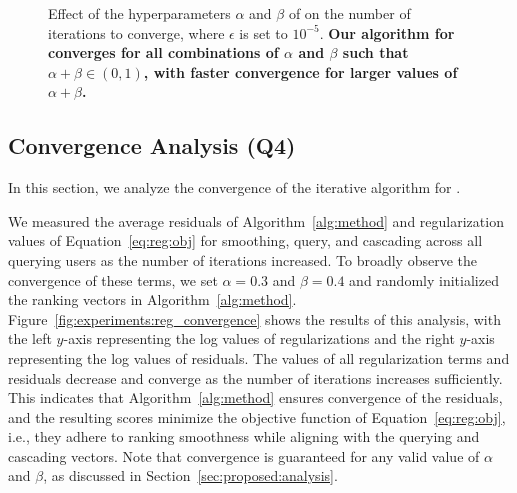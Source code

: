 \begin{figure}[t]
    \centering
    
    \caption{
        \label{fig:experiments:iteration}
        Effect of the hyperparameters $\alpha$ and $\beta$ of \method on the number of iterations to converge, where $\epsilon$ is set to $10^{-5}$.
        \textbf{Our algorithm for \method converges for all combinations of $\alpha$ and $\beta$ such that $\alpha + \beta \in (0, 1)$, with faster convergence for larger values of $\alpha + \beta$.}
    }
\end{figure}

\subsection{Convergence Analysis (Q4)}
\label{sec:experiments:convergence}
In this section, we analyze the convergence of the iterative algorithm for \method.

We measured the average residuals of Algorithm~\ref{alg:method} and regularization values of Equation~\eqref{eq:reg:obj} for smoothing, query, and cascading across all querying users as the number of iterations increased.
To broadly observe the convergence of these terms, we set $\alpha = 0.3$ and $\beta = 0.4$ and randomly initialized the ranking vectors in Algorithm~\ref{alg:method}.
Figure~\ref{fig:experiments:reg_convergence} shows the results of this analysis, with the left $y$-axis representing the log values of regularizations and the right $y$-axis representing the log values of residuals.
The values of all regularization terms and residuals decrease and converge as the number of iterations increases sufficiently.
This indicates that Algorithm~\ref{alg:method} ensures convergence of the residuals, and the resulting scores minimize the objective function of Equation~\eqref{eq:reg:obj}, i.e., they adhere to ranking smoothness while aligning with the querying and cascading vectors. 
Note that convergence is guaranteed for any valid value of $\alpha$ and $\beta$, as discussed in Section~\ref{sec:proposed:analysis}.


